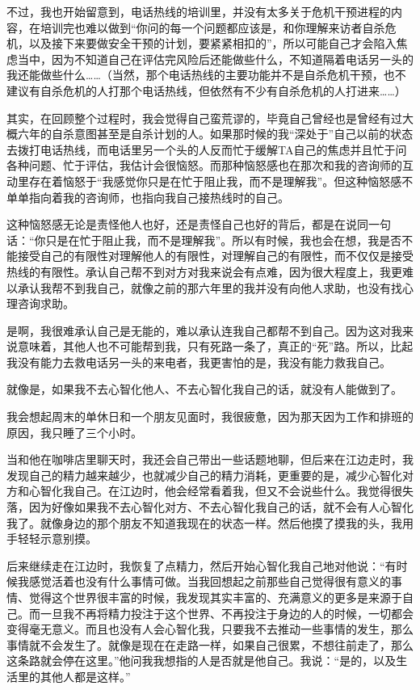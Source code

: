 不过，我也开始留意到，电话热线的培训里，并没有太多关于危机干预进程的内容，在培训完也难以做到“你问的每一个问题都应该是，和你理解来访者自杀危机，以及接下来要做安全干预的计划，要紧紧相扣的”，所以可能自己才会陷入焦虑当中，因为不知道自己在评估完风险后还能做些什么，不知道隔着电话另一头的我还能做些什么……（当然，那个电话热线的主要功能并不是自杀危机干预，也不建议有自杀危机的人打那个电话热线，但依然有不少有自杀危机的人打进来……）

其实，在回顾整个过程时，我会觉得自己蛮荒谬的，毕竟自己曾经也是曾经有过大概六年的自杀意图甚至是自杀计划的人。如果那时候的我“深处于”自己以前的状态去拨打电话热线，而电话里另一个头的人反而忙于缓解TA自己的焦虑并且忙于问各种问题、忙于评估，我估计会很恼怒。而那种恼怒感也在那次和我的咨询师的互动里存在着\pozhehao{}恼怒于“我感觉你只是在忙于阻止我，而不是理解我”。但这种恼怒感不单单指向着我的咨询师，也指向我自己\pozhehao{}接热线时的自己。

这种恼怒感\pozhehao{}无论是责怪他人也好，还是责怪自己也好\pozhehao{}的背后，都是在说同一句话：“你只是在忙于阻止我，而不是理解我”。所以有时候，我也会在想，我是否不能接受自己的有限性\pozhehao{}对理解他人的有限性，对理解自己的有限性，而不仅仅是接受热线的有限性。承认自己帮不到对方对我来说会有点难，因为很大程度上，我更难以承认我帮不到我自己，就像之前的那六年里的我并没有向他人求助，也没有找心理咨询求助。

是啊，我很难承认自己是无能的，难以承认连我自己都帮不到自己。因为这对我来说意味着，其他人也不可能帮到我，只有死路一条了，真正的“死”路。所以，比起我没有能力去救电话另一头的来电者，我更害怕的是，我没有能力救我自己。

就像是，如果我不去心智化他人、不去心智化我自己的话，就没有人能做到了。

我会想起周末的单休日和一个朋友见面时，我很疲惫，因为那天因为工作和排班的原因，我只睡了三个小时。

当和他在咖啡店里聊天时，我还会自己带出一些话题地聊，但后来在江边走时，我发现自己的精力越来越少，也就减少自己的精力消耗，更重要的是，减少心智化对方和心智化我自己。在江边时，他会经常看着我，但又不会说些什么。我觉得很失落，因为好像如果我不去心智化对方、不去心智化我自己的话，就不会有人心智化我了。就像身边的那个朋友不知道我现在的状态一样。然后他摸了摸我的头，我用手轻轻示意别摸。

后来继续走在江边时，我恢复了点精力，然后开始心智化我自己地对他说：“有时候我感觉活着也没有什么事情可做。当我回想起之前那些自己觉得很有意义的事情、觉得这个世界很丰富的时候，我发现其实丰富的、充满意义的更多是来源于自己。而一旦我不再将精力投注于这个世界、不再投注于身边的人的时候，一切都会变得毫无意义。而且也没有人会心智化我，只要我不去推动一些事情的发生，那么事情就不会发生了。就像是现在在走路一样，如果自己很累，不想往前走了，那么这条路就会停在这里。”他问我我想指的人是否就是他自己。我说：“是的，以及生活里的其他人都是这样。”

